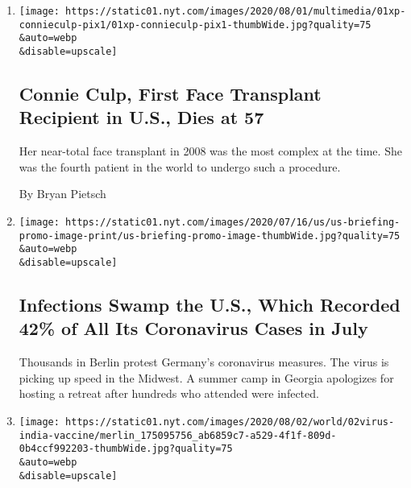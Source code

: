 \begin{enumerate}
\def\labelenumi{\arabic{enumi}.}
\item
  \href{/2020/08/01/us/Connie-culp-dead-face-transplant.html}{}

  \texttt{[image: https://static01.nyt.com/images/2020/08/01/multimedia/01xp-connieculp-pix1/01xp-connieculp-pix1-thumbWide.jpg?quality=75\\\&auto=webp\\\&disable=upscale]}

  \hypertarget{connie-culp-first-face-transplant-recipient-in-us-dies-at-57}{%
  \subsection{Connie Culp, First Face Transplant Recipient in U.S., Dies
  at
  57}\label{connie-culp-first-face-transplant-recipient-in-us-dies-at-57}}

  Her near-total face transplant in 2008 was the most complex at the
  time. She was the fourth patient in the world to undergo such a
  procedure.

  By Bryan Pietsch
\item
  \href{/2020/08/01/world/coronavirus-covid-19.html}{}

  \texttt{[image: https://static01.nyt.com/images/2020/07/16/us/us-briefing-promo-image-print/us-briefing-promo-image-thumbWide.jpg?quality=75\\\&auto=webp\\\&disable=upscale]}

  \hypertarget{infections-swamp-the-us-which-recorded-42-of-all-its-coronavirus-cases-in-july}{%
  \subsection{Infections Swamp the U.S., Which Recorded 42\% of All Its
  Coronavirus Cases in
  July}\label{infections-swamp-the-us-which-recorded-42-of-all-its-coronavirus-cases-in-july}}

  Thousands in Berlin protest Germany's coronavirus measures. The virus
  is picking up speed in the Midwest. A summer camp in Georgia
  apologizes for hosting a retreat after hundreds who attended were
  infected.
\item
  \href{/2020/08/01/world/asia/coronavirus-vaccine-india.html}{}

  \texttt{[image: https://static01.nyt.com/images/2020/08/02/world/02virus-india-vaccine/merlin\_175095756\_ab6859c7-a529-4f1f-809d-0b4ccf992203-thumbWide.jpg?quality=75\\\&auto=webp\\\&disable=upscale]}

  \hypertarget{indian-billionaires-bet-big-on-head-start-in-coronavirus-vaccine-race}{%
}
\end{enumerate}

